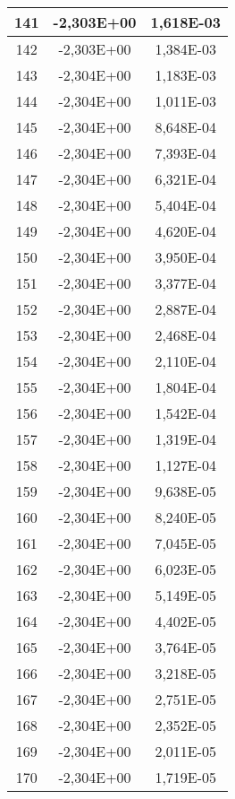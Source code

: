 \documentclass[12pt]{article}
\begin{document}
\begin{center}
\begin{longtable}{|c|c|c|}
    141	&     -2,303E+00	&   1,618E-03 \\ \hline
    142	&     -2,303E+00	&   1,384E-03 \\ \hline
    143	&     -2,304E+00	&   1,183E-03 \\ \hline
    144	&     -2,304E+00	&   1,011E-03 \\ \hline
    145	&     -2,304E+00	&   8,648E-04 \\ \hline
    146	&     -2,304E+00	&   7,393E-04 \\ \hline
    147	&     -2,304E+00	&   6,321E-04 \\ \hline
    148	&     -2,304E+00	&   5,404E-04 \\ \hline
    149	&     -2,304E+00	&   4,620E-04 \\ \hline
    150	&     -2,304E+00	&   3,950E-04 \\ \hline
    151	&     -2,304E+00	&   3,377E-04 \\ \hline
    152	&     -2,304E+00	&   2,887E-04 \\ \hline
    153	&     -2,304E+00	&   2,468E-04 \\ \hline
    154	&     -2,304E+00	&   2,110E-04 \\ \hline
    155	&     -2,304E+00	&   1,804E-04 \\ \hline
    156	&     -2,304E+00	&   1,542E-04 \\ \hline
    157	&     -2,304E+00	&   1,319E-04 \\ \hline
    158	&     -2,304E+00	&   1,127E-04 \\ \hline
    159	&     -2,304E+00	&   9,638E-05 \\ \hline
    160	&     -2,304E+00	&   8,240E-05 \\ \hline
    161	&     -2,304E+00	&   7,045E-05 \\ \hline
    162	&     -2,304E+00	&   6,023E-05 \\ \hline
    163	&     -2,304E+00	&   5,149E-05 \\ \hline
    164	&     -2,304E+00	&   4,402E-05 \\ \hline
    165	&     -2,304E+00	&   3,764E-05 \\ \hline
    166	&     -2,304E+00	&   3,218E-05 \\ \hline
    167	&     -2,304E+00	&   2,751E-05 \\ \hline
    168	&     -2,304E+00	&   2,352E-05 \\ \hline
    169	&     -2,304E+00	&   2,011E-05 \\ \hline
    170	&     -2,304E+00	&   1,719E-05 \\ \hline

\end{longtable}
\end{center}
\end{document}
